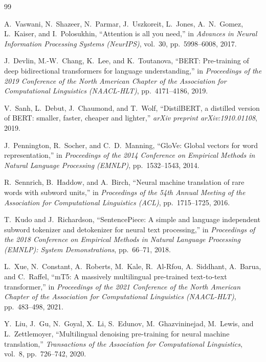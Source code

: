 \begin{thebibliography}{99}

A.~Vaswani, N.~Shazeer, N.~Parmar, J.~Uszkoreit, L.~Jones, A.~N.~Gomez, L.~Kaiser, and I.~Polosukhin,
``Attention is all you need,''
in \emph{Advances in Neural Information Processing Systems (NeurIPS)}, vol.~30, pp.~5998--6008, 2017.

J.~Devlin, M.-W.~Chang, K.~Lee, and K.~Toutanova,
``BERT: Pre-training of deep bidirectional transformers for language understanding,''
in \emph{Proceedings of the 2019 Conference of the North American Chapter of the Association for Computational Linguistics (NAACL-HLT)}, pp.~4171--4186, 2019.

V.~Sanh, L.~Debut, J.~Chaumond, and T.~Wolf,
``DistilBERT, a distilled version of BERT: smaller, faster, cheaper and lighter,''
\emph{arXiv preprint arXiv:1910.01108}, 2019.

J.~Pennington, R.~Socher, and C.~D.~Manning,
``GloVe: Global vectors for word representation,''
in \emph{Proceedings of the 2014 Conference on Empirical Methods in Natural Language Processing (EMNLP)}, pp.~1532--1543, 2014.

R.~Sennrich, B.~Haddow, and A.~Birch,
``Neural machine translation of rare words with subword units,''
in \emph{Proceedings of the 54th Annual Meeting of the Association for Computational Linguistics (ACL)}, pp.~1715--1725, 2016.

T.~Kudo and J.~Richardson,
``SentencePiece: A simple and language independent subword tokenizer and detokenizer for neural text processing,''
in \emph{Proceedings of the 2018 Conference on Empirical Methods in Natural Language Processing (EMNLP): System Demonstrations}, pp.~66--71, 2018.

L.~Xue, N.~Constant, A.~Roberts, M.~Kale, R.~Al-Rfou, A.~Siddhant, A.~Barua, and C.~Raffel,
``mT5: A massively multilingual pre-trained text-to-text transformer,''
in \emph{Proceedings of the 2021 Conference of the North American Chapter of the Association for Computational Linguistics (NAACL-HLT)}, pp.~483--498, 2021.

Y.~Liu, J.~Gu, N.~Goyal, X.~Li, S.~Edunov, M.~Ghazvininejad, M.~Lewis, and L.~Zettlemoyer,
``Multilingual denoising pre-training for neural machine translation,''
\emph{Transactions of the Association for Computational Linguistics}, vol.~8, pp.~726--742, 2020.


\end{thebibliography}
